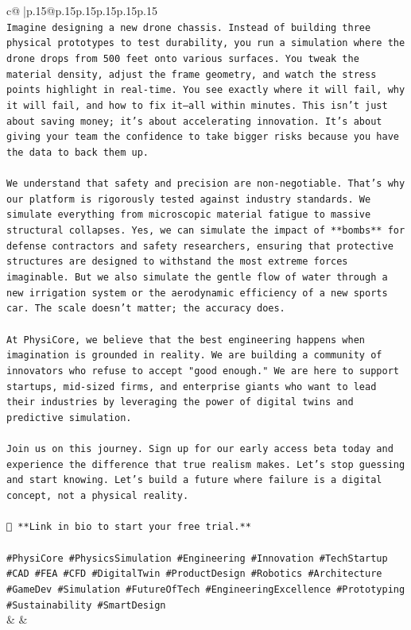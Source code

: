 \documentclass{article}
\begin{document}
{\begin{supertabular}{c@{$\;$}|p{.15\linewidth}@{}p{.15\linewidth}p{.15\linewidth}p{.15\linewidth}p{.15\linewidth}p{.15\linewidth}}
{{{\\ 
\texttt{Imagine designing a new drone chassis. Instead of building three physical prototypes to test durability, you run a simulation where the drone drops from 500 feet onto various surfaces. You tweak the material density, adjust the frame geometry, and watch the stress points highlight in real{-}time. You see exactly where it will fail, why it will fail, and how to fix it—all within minutes. This isn’t just about saving money; it’s about accelerating innovation. It’s about giving your team the confidence to take bigger risks because you have the data to back them up.} \\
\\ 
\texttt{We understand that safety and precision are non{-}negotiable. That’s why our platform is rigorously tested against industry standards. We simulate everything from microscopic material fatigue to massive structural collapses. Yes, we can simulate the impact of **bombs** for defense contractors and safety researchers, ensuring that protective structures are designed to withstand the most extreme forces imaginable. But we also simulate the gentle flow of water through a new irrigation system or the aerodynamic efficiency of a new sports car. The scale doesn’t matter; the accuracy does.} \\
\\ 
\texttt{At PhysiCore, we believe that the best engineering happens when imagination is grounded in reality. We are building a community of innovators who refuse to accept "good enough." We are here to support startups, mid{-}sized firms, and enterprise giants who want to lead their industries by leveraging the power of digital twins and predictive simulation.} \\
\\ 
\texttt{Join us on this journey. Sign up for our early access beta today and experience the difference that true realism makes. Let’s stop guessing and start knowing. Let’s build a future where failure is a digital concept, not a physical reality.} \\
\\ 
\texttt{🔗 **Link in bio to start your free trial.**} \\
\\ 
\texttt{\#PhysiCore \#PhysicsSimulation \#Engineering \#Innovation \#TechStartup \#CAD \#FEA \#CFD \#DigitalTwin \#ProductDesign \#Robotics \#Architecture \#GameDev \#Simulation \#FutureOfTech \#EngineeringExcellence \#Prototyping \#Sustainability \#SmartDesign} \\
            }
        }
    }
    & & \\ \\


\end{supertabular}}
\end{document}
